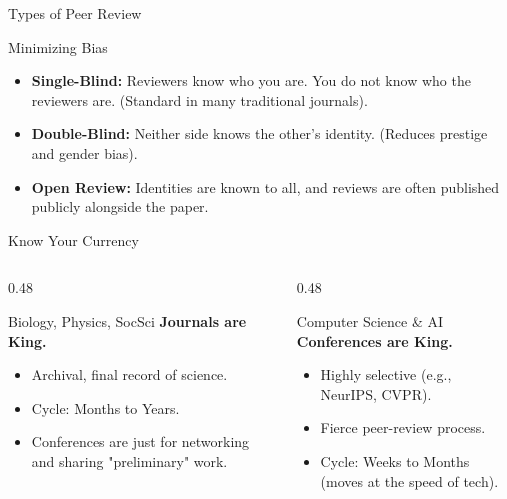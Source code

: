 \documentclass[aspectratio=169]{beamer}
\begin{document}
\begin{frame}{Types of Peer Review}
  \begin{block}{Minimizing Bias}
    \begin{itemize}
      \item \textbf{Single-Blind:} Reviewers know who you are. You do not know who the reviewers are. (Standard in many traditional journals).
      \item \textbf{Double-Blind:} Neither side knows the other's identity. (Reduces prestige and gender bias).
      \item \textbf{Open Review:} Identities are known to all, and reviews are often published publicly alongside the paper.
    \end{itemize}
  \end{block}
\end{frame}

\begin{frame}{Know Your Currency}
  \begin{columns}[T]
    \begin{column}{0.48\textwidth}
      \begin{alertblock}{Biology, Physics, SocSci}
        \textbf{Journals are King.}
        \begin{itemize}
          \item Archival, final record of science.
          \item Cycle: Months to Years.
          \item Conferences are just for networking and sharing "preliminary" work.
        \end{itemize}
      \end{alertblock}
    \end{column}
    \begin{column}{0.48\textwidth}
      \begin{block}{Computer Science \& AI}
        \textbf{Conferences are King.}
        \begin{itemize}
          \item Highly selective (e.g., NeurIPS, CVPR).
          \item Fierce peer-review process.
          \item Cycle: Weeks to Months (moves at the speed of tech).
        \end{itemize}
      \end{block}
    \end{column}
  \end{columns}
\end{frame}
\end{document}
